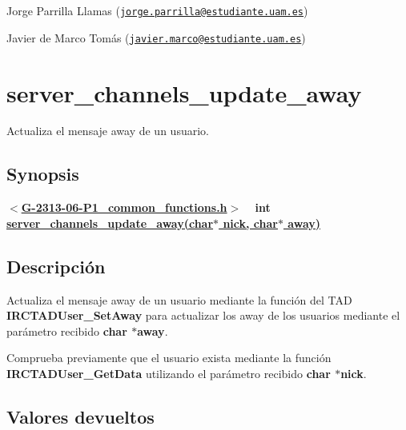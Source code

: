 \begin{DoxyItemize}
\item Jorge Parrilla Llamas (\href{mailto:jorge.parrilla@estudiante.uam.es}{\tt jorge.\+parrilla@estudiante.\+uam.\+es}) 
\item Javier de Marco Tomás (\href{mailto:javier.marco@estudiante.uam.es}{\tt javier.\+marco@estudiante.\+uam.\+es}) 
\end{DoxyItemize}\hypertarget{server_channels_update_away}{}\section{server\+\_\+channels\+\_\+update\+\_\+away}\label{server_channels_update_away}
Actualiza el mensaje away de un usuario.\hypertarget{server_channels_update_away_synopsis_server_channels_update_away}{}\subsection{Synopsis}\label{server_channels_update_away_synopsis_server_channels_update_away}
{ {\bfseries $<$\hyperlink{G-2313-06-P1__common__functions_8h}{G-\/2313-\/06-\/\+P1\+\_\+common\+\_\+functions.\+h}$>$} ~\newline
 {\bfseries int \hyperlink{G-2313-06-P1__common__functions_8c_af9aeb632d55a4cbbe842ab97001b5128}{server\+\_\+channels\+\_\+update\+\_\+away(char$\ast$ nick, char$\ast$ away)}} } \hypertarget{server_channels_update_away_descripcion_server_channels_update_away}{}\subsection{Descripción}\label{server_channels_update_away_descripcion_server_channels_update_away}
Actualiza el mensaje away de un usuario mediante la función del T\+AD {\bfseries I\+R\+C\+T\+A\+D\+User\+\_\+\+Set\+Away} para actualizar los away de los usuarios mediante el parámetro recibido {\bfseries char $\ast$away}. 

Comprueba previamente que el usuario exista mediante la función {\bfseries I\+R\+C\+T\+A\+D\+User\+\_\+\+Get\+Data} utilizando el parámetro recibido {\bfseries char $\ast$nick}.\hypertarget{server_channels_update_away_return_server_channels_update_away}{}\subsection{Valores devueltos}\label{server_channels_update_away_return_server_channels_update_away}

